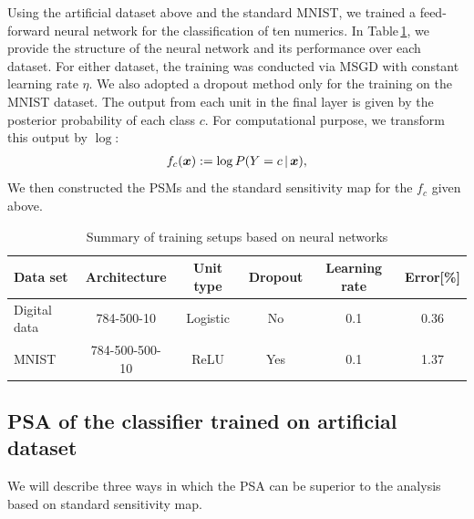 Using the artificial dataset above and the standard MNIST, we trained a feed-forward neural
network for the classification of ten numerics.
%
In Table\,\ref{tab:NN_specification}, we provide the structure of the neural network and its performance over
each dataset.
%
For either dataset, the training was conducted via MSGD with constant
learning rate $\eta$.
%
%
We also adopted a dropout method \cite{Hinton2012} only for the training
on the MNIST dataset.
%
The output from each unit in the final layer is given by the posterior
probability of each class $c$.
%
For computational purpose, we transform this output by $\log$:
%
\begin{align}
 f_{c}(\mbox{\boldmath $x$}) := \log P(Y = c \,|\, \mbox{\boldmath $x$}),
\end{align}
%
We then constructed the PSMs and the standard sensitivity map for the $f_c$
given above.
\begin{table}[htbp]
 \caption{Summary of training setups based on neural networks}
 \centering
 \begin{tabular}{lccccc}
  \hline
  \textbf{Data set} & \textbf{Architecture} & \textbf{Unit type} & \textbf{Dropout}
  & \textbf{Learning rate} & \textbf{Error[\%]} \\
  \hline
  Digital data & 784-500-10 & Logistic & No & 0.1 & 0.36  \\
  MNIST & 784-500-500-10 & ReLU & Yes &  0.1 & 1.37 \\
  \hline
 \end{tabular}
 \label{tab:NN_specification}
\end{table}

\subsection{PSA of the classifier trained on artificial dataset}
%
We will describe three ways in which the PSA can be superior to the
analysis based on standard sensitivity map.

